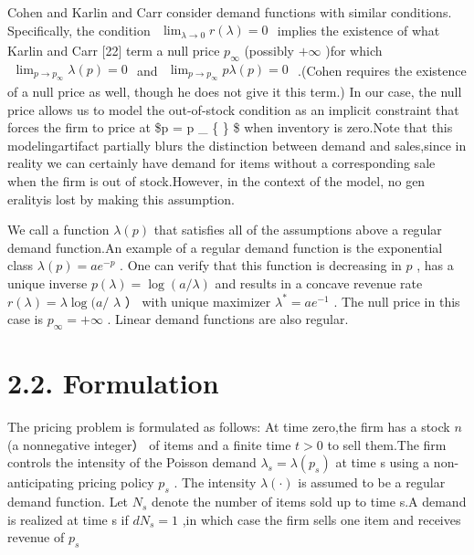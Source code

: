 Cohen and Karlin and Carr consider demand functions with similar
conditions. Specifically, the condition
\(\begin{array} { r } { \operatorname* { l i m } _ { \lambda \to 0 } r ( \lambda ) = 0 } \end{array}\)
implies the existence of what Karlin and Carr {[}22{]} term a null price
\(p _ { \infty }\) (possibly \(+ \infty\) )for which
\(\begin{array} { r } { \operatorname* { l i m } _ { p \to p _ { \infty } } \lambda ( p ) = 0 } \end{array}\)
and
\(\begin{array} { r } { \operatorname* { l i m } _ { p \to p _ { \infty } } p \lambda ( p ) = 0 } \end{array}\)
.(Cohen requires the existence of a null price as well, though he does
not give it this term.) In our case, the null price allows us to model
the out-of-stock condition as an implicit constraint that forces the
firm to price at \$p = p \_ \{ \} \$ when inventory is zero.Note that
this modelingartifact partially blurs the distinction between demand and
sales,since in reality we can certainly have demand for items without a
corresponding sale when the firm is out of stock.However, in the context
of the model, no gen eralityis lost by making this assumption.

We call a function \(\lambda ( p )\) that satisfies all of the
assumptions above a regular demand function.An example of a regular
demand function is the exponential class
\(\lambda ( p ) = a e ^ { - p }\) . One can verify that this function is
decreasing in \(p\) , has a unique inverse
\(p ( \lambda ) = \log { ( a / \lambda ) }\) and results in a concave
revenue rate \(r ( \lambda ) = \lambda \log  ( a /\) \(\lambda\) ） with
unique maximizer \(\lambda ^ { * } = a e ^ { - 1 }\) . The null price in
this case is \(p _ { \infty } = + \infty\) . Linear demand functions are
also regular.

\section{2.2. Formulation}\label{formulation}

The pricing problem is formulated as follows: At time zero,the firm has
a stock \(n\) (a nonnegative integer） of items and a finite time
\(t > 0\) to sell them.The firm controls the intensity of the Poisson
demand \(\lambda _ { s } = \lambda ( p _ { s } )\) at time s using a
non-anticipating pricing policy \(p _ { s }\) . The intensity
\(\lambda ( \cdot )\) is assumed to be a regular demand function. Let
\(N _ { s }\) denote the number of items sold up to time s.A demand is
realized at time s if \(d N _ { s } = 1\) ,in which case the firm sells
one item and receives revenue of \(p _ { s }\)

